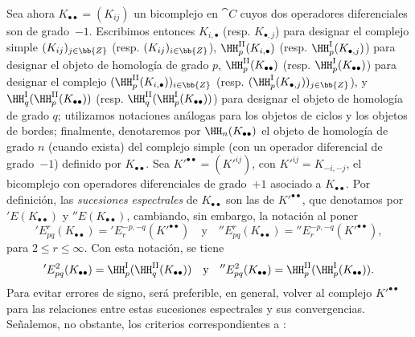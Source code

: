 \documentclass[oneside]{amsart}
\renewcommand{\leq}{\leqslant}
\let\EGAOriginalLabel\label
\renewcommand{\label}[1]{\phantomsection\EGAOriginalLabel{#1}}
\begin{document}
\begin{env}[11.3.5]
\label{0.11.3.5}
Sea ahora $K_{\bullet\bullet} = (K_{ij})$ un bicomplejo en $\cat{C}$ cuyos dos operadores diferenciales son de grado~$-1$.
Escribimos entonces $K_{i,\bullet}$ (resp. $K_{\bullet,j}$) para designar el complejo simple $(K_{ij})_{j\in\bb{Z}}$ (resp. $(K_{ij})_{i\in\bb{Z}}$), $\HH_{p}^\mathrm{II}(K_{i, \bullet})$ (resp. $\HH_{p}^\mathrm{I}(K_{\bullet, j})$) para designar el objeto de homología de grado $p$, $\HH_{p}^\mathrm{II}(K_{\bullet\bullet})$ (resp. $\HH_{p}^\mathrm{I}(K_{\bullet\bullet})$) para designar el complejo $(\HH_{p}^\mathrm{II}(K_{i, \bullet}))_{i \in\bb{Z}}$ (resp. $(\HH_{p}^\mathrm{I}(K_{\bullet, j}))_{j \in\bb{Z}}$), y $\HH_q^\mathrm{I}(\HH_{p}^\mathrm{II}(K_{\bullet\bullet}))$ (resp. $\HH_q^\mathrm{II}(\HH_{p}^\mathrm{I}(K_{\bullet\bullet}))$) para designar el objeto de homología de grado $q$;
utilizamos notaciones análogas para los objetos de ciclos y los objetos de bordes;
finalmente, denotaremos por $\HH_n(K_{\bullet\bullet})$ el objeto de homología de grado $n$ (cuando exista) del complejo simple (con un operador diferencial de grado~$-1$) definido por $K_{\bullet\bullet}$.
Sea $K'^{\bullet\bullet}=(K'^{ij})$, con $K'^{ij}=K_{-i,-j}$, el bicomplejo con operadores diferenciales de grado~$+1$ asociado a $K_{\bullet\bullet}$.
Por definición, las \emph{sucesiones espectrales} de $K_{\bullet\bullet}$ son las de $K'^{\bullet\bullet}$, que denotamos por $'E(K_{\bullet\bullet})$ y $''E(K_{\bullet\bullet})$, cambiando, sin embargo, la notación al poner
\[
  'E_{pq}^{r}(K_{\bullet\bullet})
  = 'E_{r}^{-p,-q}(K'^{\bullet\bullet})
  \quad\text{y}\quad
  ''E_{pq}^{r}(K_{\bullet\bullet})
  = ''E_{r}^{-p,-q}(K'^{\bullet\bullet}), 
\]
para $2\leq r \leq \infty$.
Con esta notación, se tiene
\[
  'E_{pq}^{2}(K_{\bullet\bullet})
  = \HH_{p}^\mathrm{I}(\HH_{q}^\mathrm{II}(K_{\bullet\bullet}))
  \quad\text{y}\quad
  ''E_{pq}^{2}(K_{\bullet\bullet})
  = \HH_{p}^\mathrm{II}(\HH_{p}^\mathrm{I}(K_{\bullet\bullet})).
\]
Para evitar errores de signo, será preferible, en general, volver al complejo $K'^{\bullet\bullet}$ para las relaciones entre estas sucesiones espectrales y sus convergencias.
Señalemos, no obstante, los criterios correspondientes a :
\end{env}
\end{document}
